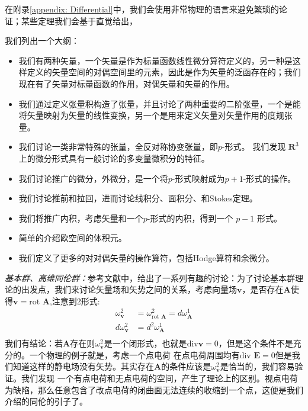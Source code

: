 \documentclass[supercite]{HustGraduPaper}
\newcommand{\bv}{\mathbf{v}}
\newcommand{\bA}{\mathbf{A}}
\begin{document}
	在附录\ref{appendix: Differential}中，我们会使用非常物理的语言来避免繁琐的论证；某些定理我们会基于直觉给出，
	
	我们列出一个大纲：
	\begin{itemize}
		\item 我们有两种矢量，一个矢量是作为标量函数线性微分算符定义的，另一种是这样定义的矢量空间的对偶空间里的元素，因此是作为矢量的泛函存在的；我们现在有了矢量对标量函数的作用，对偶矢量和矢量的作用。
		\item 我们通过定义张量积构造了张量，并且讨论了两种重要的二阶张量，一个是能将矢量映射为矢量的线性变换，另一个是用来定义矢量对矢量作用的度规张量。
		\item 我们讨论一类非常特殊的张量，全反对称协变张量，即$p$-形式。 我们发现 $\mathbf{R}^3$ 上的微分形式具有一般讨论的多变量微积分的特征。
		\item 我们讨论推广的微分，外微分，是一个将$p$-形式映射成为$p+1$-形式的操作。
		\item 我们讨论推前和拉回，进而讨论线积分、面积分、和Stokes定理。
		\item 我们将推广内积，考虑矢量和一个$p$-形式的内积，得到一个 $p-1$ 形式。
		\item 简单的介绍欧空间的体积元。
		\item 我们定义了更多的对对偶矢量的操作算符，包括Hodge算符和余微分。
	\end{itemize}
	
	\textit{基本群、高维同伦群：}参考文献\cite{扬政1998物理学中的几何方法,frankel2011geometry}中，给出了一系列有趣的讨论：为了讨论基本群理论的出发点，我们来讨论矢量场和矢势之间的关系，考虑向量场$\bv$，是否存在$\bA$使得$\bv = \text{rot } \bA$,注意到2形式:
	\begin{equation}
	\begin{aligned}
	\omega_{\bv}^{2} &= \omega_{\text{rot } \bA}^2 = d \omega_{\bA}^1\\
	d\omega_{\bv}^{2} &= d^2 \omega_{\bA}^1\\
	\end{aligned}
	\end{equation}
	我们有结论：若$\bA$存在则$\omega_{\bv}^{2}$是一个闭形式，也就是$\text{div} \bv = 0$，但是这个条件不是充分的。一个物理的例子就是，考虑一个点电荷
	在点电荷周围均有$\text{div } \mathbf{E} = 0$但是我们知道这样的静电场没有矢势。其实存在$\bA$的条件应该是$\omega_{\bv}^{2}$是恰当的，我们容易验证。我们发现
	一个有点电荷和无点电荷的空间，产生了理论上的区别。视点电荷为缺陷，那么任意包含了改点电荷的闭曲面无法连续的收缩到一个点，这便是我们介绍的同伦的引子了。
	
\end{document}
